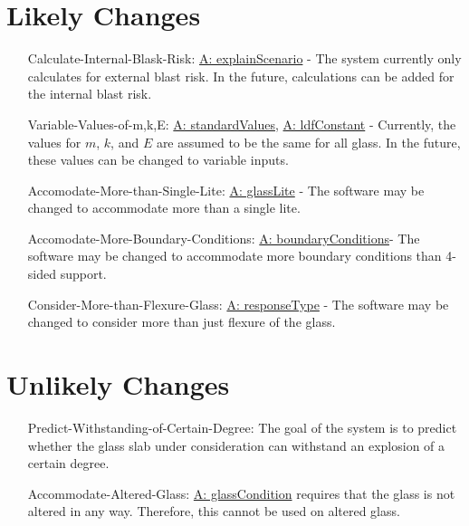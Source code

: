 \documentclass[12pt]{article}
\begin{document}
\section{Likely Changes}
\label{Sec:LCs}
\begin{itemize}
\item[Calculate-Internal-Blask-Risk:\phantomsection\label{calcInternalBlastRisk}]\hyperref[A:explainScenario]{A: explainScenario} - The system currently only calculates for external blast risk. In the future, calculations can be added for the internal blast risk.
\item[Variable-Values-of-m,k,E:\phantomsection\label{varValsOfmkE}]\hyperref[A:standardValues]{A: standardValues}, \hyperref[A:ldfConstant]{A: ldfConstant} - Currently, the values for $m$, $k$, and $E$ are assumed to be the same for all glass. In the future, these values can be changed to variable inputs.
\item[Accomodate-More-than-Single-Lite:\phantomsection\label{accMoreThanSingleLite}]\hyperref[A:glassLite]{A: glassLite} - The software may be changed to accommodate more than a single lite.
\item[Accomodate-More-Boundary-Conditions:\phantomsection\label{accMoreBoundaryConditions}]\hyperref[A:boundaryConditions]{A: boundaryConditions}- The software may be changed to accommodate more boundary conditions than 4-sided support.
\item[Consider-More-than-Flexure-Glass:\phantomsection\label{considerMoreThanFlexGlass}]\hyperref[A:responseType]{A: responseType} - The software may be changed to consider more than just flexure of the glass.
\end{itemize}
\section{Unlikely Changes}
\label{Sec:UCs}
\begin{itemize}
\item[Predict-Withstanding-of-Certain-Degree:\phantomsection\label{predictWithstandOfCertDeg}]The goal of the system is to predict whether the glass slab under consideration can withstand an explosion of a certain degree.
\item[Accommodate-Altered-Glass:\phantomsection\label{accAlteredGlass}]\hyperref[A:glassCondition]{A: glassCondition} requires that the glass is not altered in any way. Therefore, this cannot be used on altered glass.
\end{itemize}
\end{document}
